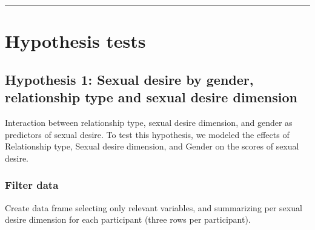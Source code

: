\documentclass[
  bookmarksnumbered]{article}
\begin{document}
\begin{center}\rule{0.5\linewidth}{0.5pt}\end{center}

\hypertarget{hypothesis-tests}{%
\section{Hypothesis tests}\label{hypothesis-tests}}

\hypertarget{hyp1}{%
\subsection{Hypothesis 1: Sexual desire by gender, relationship type and sexual desire dimension}\label{hyp1}}

Interaction between relationship type, sexual desire dimension, and gender as predictors of sexual desire. To test this hypothesis, we modeled the effects of Relationship type, Sexual desire dimension, and Gender on the scores of sexual desire.

\hypertarget{filter-data}{%
\subsubsection{Filter data}\label{filter-data}}

Create data frame selecting only relevant variables, and summarizing per sexual desire dimension for each participant (three rows per participant).
\end{document}
